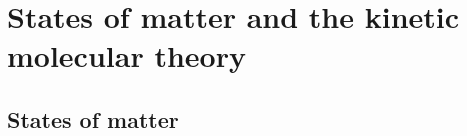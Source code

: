          \chapter{States of matter and the kinetic molecular theory}
\label{m38736*cid2}
            \section{States of matter}
            \nopagebreak

